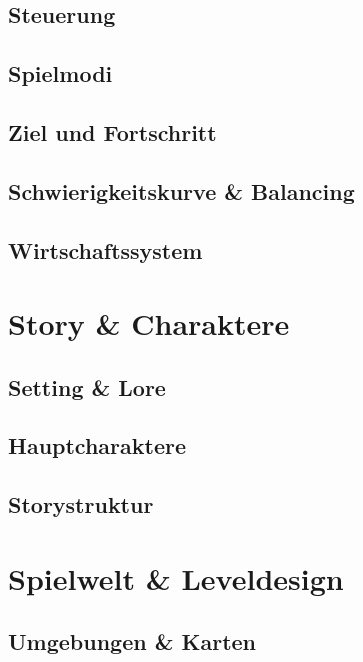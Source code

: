 \documentclass[11pt, a4paper]{article} %
\begin{document}
\subsection{Steuerung}
\subsection{Spielmodi}
\subsection{Ziel und Fortschritt}
\subsection{Schwierigkeitskurve \& Balancing}
\subsection{Wirtschaftssystem}

\newpage

\section{Story \& Charaktere}
\subsection{Setting \& Lore}
\subsection{Hauptcharaktere}
\subsection{Storystruktur}

\newpage

\section{Spielwelt \& Leveldesign}
\subsection{Umgebungen \& Karten}
\end{document}
